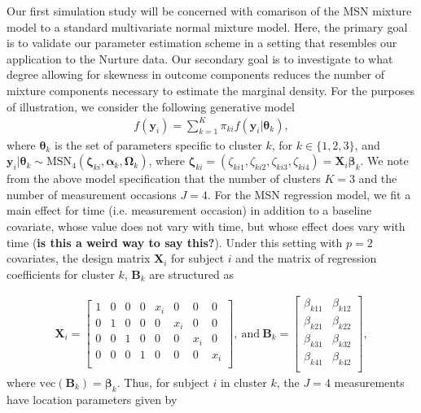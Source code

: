 \documentclass[useAMS,referee]{biom}
\begin{document}
Our first simulation study will be concerned with comarison of the MSN mixture model to a standard multivariate normal mixture model. Here, the primary goal is to validate our parameter estimation scheme in a setting that resembles our application to the Nurture data. Our secondary goal is to investigate to what degree allowing for skewness in outcome components reduces the number of mixture components necessary to estimate the marginal density. For the purposes of illustration, we consider the following generative model 
\begin{eqnarray}
	f(\mathbf{y}_i) = \sum_{k = 1}^K \pi_{ki} f(\mathbf{y}_i | \boldsymbol\theta_k), \nonumber
\end{eqnarray}
where $\boldsymbol\theta_k$ is the set of parameters specific to cluster $k$, for $k \in \{1,2,3 \}$, and $\mathbf{y}_i | \boldsymbol\theta_k \sim \text{MSN}_4(\boldsymbol\zeta_{ki},\boldsymbol\alpha_k,\boldsymbol\Omega_k)$, where $\boldsymbol\zeta_{ki} = (\zeta_{ki1},\zeta_{ki2},\zeta_{ki3},\zeta_{ki4}) = \mathbf{X}_i \boldsymbol\beta_{k}$. We note from the above model specification that the number of clusters $K = 3$ and the number of measurement occasions $J = 4$. For the MSN regression model, we fit a main effect for time (i.e. measurement occasion) in addition to a baseline covariate, whose value does not vary with time, but whose effect does vary with time (\textbf{is this a weird way to say this?}). Under this setting with $p = 2$ covariates, the design matrix $\mathbf{X}_i$ for subject $i$ and the matrix of regression coefficients for cluster $k$, $\mathbf{B}_k$ are structured as

\begin{eqnarray}
	\mathbf{X}_i = 
	\begin{bmatrix}
		1 & 0 & 0 & 0 & x_i & 0 & 0 & 0\\
		0 & 1 & 0 & 0 & 0 & x_i & 0 & 0\\
		0 & 0 & 1 & 0 & 0 & 0 & x_i & 0\\
		0 & 0 & 0 & 1 & 0 & 0 & 0 & x_i\\
	\end{bmatrix}, \ \text{and} \ 
	\mathbf{B}_k = 
	\begin{bmatrix}
		\beta_{k11} & \beta_{k12} \\
		\beta_{k21} & \beta_{k22} \\
		\beta_{k31} & \beta_{k32} \\
		\beta_{k41} & \beta_{k42} \\
	\end{bmatrix}, \nonumber
\end{eqnarray}
where $\text{vec}({\mathbf{B}_k}) = \boldsymbol\beta_k$. Thus, for subject $i$ in cluster $k$, the $J = 4$ measurements have location parameters given by
\end{document}
